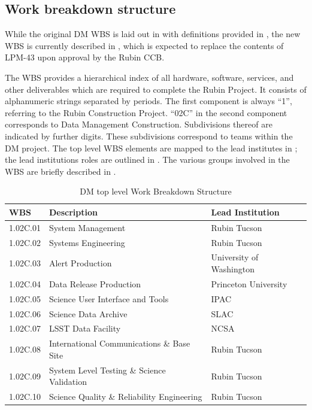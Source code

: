\subsection{Work breakdown structure}\label{sect:WBS}

While the original DM WBS is laid out in  with definitions provided in ,
the new WBS is currently described in , which is expected to replace the contents of LPM-43 upon approval by the Rubin CCB.

The WBS provides a hierarchical index of all hardware, software, services, and other deliverables which are required to complete the Rubin Project.
It consists of alphanumeric strings separated by periods.
The first component is always “1”, referring to the Rubin Construction Project.
``02C'' in the second component corresponds to Data Management Construction.
Subdivisions thereof are indicated by further digits.
These subdivisions correspond to teams within the DM project.
The top level WBS elements are mapped to the lead institutes in ; the lead institutions roles are outlined in .
The various groups involved in the WBS are briefly described in .

\begin{table}
\caption{DM top level Work Breakdown Structure \label{tab:wbs}}
\begin{center}
\begin{tabular}[htb]{|l|l|l|} \hline
\textbf{WBS}  &  \textbf{Description}   &  \textbf{Lead Institution}\\ \hline
1.02C.01& System Management                         &  Rubin Tucson \\ \hline
1.02C.02& Systems Engineering                       &  Rubin Tucson \\ \hline
1.02C.03& Alert Production                          &  University of Washington\\ \hline
1.02C.04& Data Release Production                   &  Princeton University\\ \hline
1.02C.05& Science User Interface and Tools          & IPAC\\ \hline
1.02C.06& Science Data Archive                      & SLAC\\ \hline
1.02C.07& LSST Data Facility                        & NCSA\\ \hline
1.02C.08& International Communications \& Base Site & Rubin Tucson \\ \hline
1.02C.09& System Level Testing \& Science Validation& Rubin Tucson \\ \hline
1.02C.10& Science Quality \& Reliability Engineering& Rubin Tucson \\ \hline
\end{tabular}
\end{center}
\end{table}

